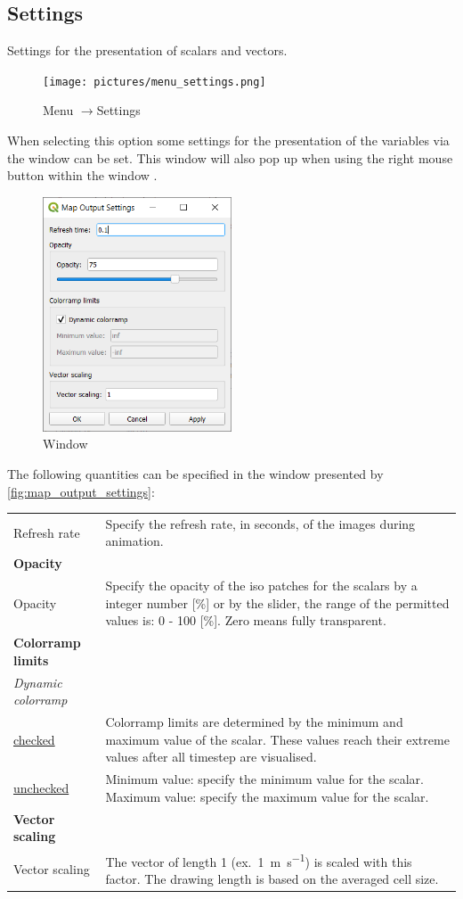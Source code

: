 \documentclass{deltares_memo}
\newcommand{\menuarrow}{$\rightarrow$}
\begin{document}
\subsection{Settings}
Settings for the presentation of scalars and vectors.
\begin{figure}[H]
    \centering    
    \texttt{[image: pictures/menu\_settings.png]}
    \caption{Menu \menuarrow Settings}
\end{figure}
When selecting this option some settings for the presentation of the variables via the window  can be set. 
This window will also pop up when using the right mouse button within the window .
\begin{figure}[H]
	\centering    
	\includegraphics[width=0.50\textwidth]{pictures/map_output_settings.png}
	\caption{Window \label{fig:map_output_settings}}
\end{figure}
The following quantities can be specified in the window presented by \autoref{fig:map_output_settings}:
\begin{longtable}{p{35mm-12pt} p{\textwidth-35mm-12pt}} 
	Refresh rate & Specify the refresh rate, in seconds, of the images during animation. \\	
	\textbf{Opacity} & \\
	Opacity & Specify the opacity of the iso patches for the scalars by a integer number [\%] or by the slider, the range of the permitted values is: 0 - 100 [\%]. Zero means fully transparent.\\
	\textbf{Colorramp limits} & \\
	\textsl{Dynamic colorramp} & \\
	\underline{checked} & Colorramp limits are determined by the minimum and maximum value of the scalar. 
	These values reach their extreme values after all timestep are visualised.\\
	\underline{unchecked} & 
	Minimum value: \quad specify the minimum value for the scalar.\newline
	Maximum value: \quad specify the maximum value for the scalar.\\
	\textbf{Vector scaling} & \\
	Vector scaling & The vector of length 1 (ex.\ \SI{1}{\metre\per\second}) is scaled with this factor. The drawing length is based on the averaged cell size.
\end{longtable}
\end{document}
